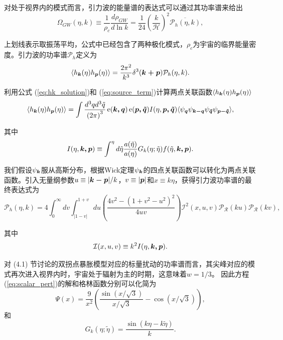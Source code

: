 对处于视界内的模式而言，引力波的能量谱的表达式可以通过其功率谱来给出
\begin{equation}\label{eq:gw_energy_spectrum}
    \Omega_{GW}(\eta,k) \equiv \frac{1}{\rho_c}\frac{d\rho_{GW}}{d\ln k}
    = \frac{1}{24}{\left(\frac{k}{\mathcal{H}}\right)}^2
    \overline{\mathcal{P}_h(\eta,k)},
\end{equation}

上划线表示取振荡平均，公式中已经包含了两种极化模式，$\rho_c$为宇宙的临界能量密度。引力波的功率谱$\mathcal{P}_h$定义为
\begin{align}\label{eq:gw_power_spectrum}
    \langle h_{\boldsymbol{k}}(\eta)h_{\boldsymbol{p}}(\eta) \rangle =
    \frac{2\pi^2}{k^3}\delta^3(\boldsymbol{k+p})\mathcal{P}_h(\eta,k).
\end{align}

利用公式 (\ref{eq:hk_solution})和
(\ref{eq:source_term})计算两点关联函数$\langle
h_{\boldsymbol{k}}(\eta)h_{\boldsymbol{p}}(\eta)\rangle$
\begin{equation}
    \langle h_{\boldsymbol{k}}(\eta)h_{\boldsymbol{p}}(\eta)\rangle =
    \int \frac{d^3 q d^3 \tilde{q}}{{(2\pi)}^3}
    \,\mathrm{e}(\boldsymbol{k,
    q})\,\mathrm{e}(\boldsymbol{p,\tilde{q}})I(\eta,\boldsymbol{p,\tilde{q}})
    \langle
    \psi_{\boldsymbol{q}}\psi_{\boldsymbol{k-q}}\psi_{\boldsymbol{\tilde{q}}}\psi_{\boldsymbol{p-\tilde{q}}}
    \rangle,
\end{equation}

其中
\begin{equation}\label{eq:I_integrate}
    I(\eta,\boldsymbol{k,p}) \equiv \int^\eta d\tilde{\eta} 
    \frac{a(\tilde{\eta})}{a(\eta)}
    G_k(\eta;\tilde{\eta})f(\tilde{\eta},\boldsymbol{k,p}).
\end{equation}

我们假设$\psi_{\boldsymbol{k}}$服从高斯分布，根据Wick定理$\psi_{\boldsymbol{k}}$的四点关联函数可以转化为两点关联函数。引入无量纲参数$u\equiv
|\boldsymbol{k-p}|/k$，$v\equiv |\boldsymbol{p}|$和$x\equiv
k\eta$，获得引力波功率谱的最终表达式为\citep{kohri2018semianalytic}
\begin{equation}
    \mathcal{P}_h(\eta,k) = 4\int_0^\infty dv \int_{|1-v|}^{1+v} du 
    \left( \frac{4v^2-{(1+v^2-u^2)}^2}{4uv} \right)
    \mathcal{I}^2(x,u,v)\mathcal{P_R}(ku)\mathcal{P_R}(kv),
\end{equation}

其中
\begin{equation}
    \mathcal{I}(x,u,v) \equiv k^2 I(\eta,\boldsymbol{k, p}).
\end{equation}

对 (4.1)
节讨论的双拐点暴胀模型对应的标量扰动的功率谱而言，其尖峰对应的模式再次进入视界内时，宇宙处于辐射为主的时期，这意味着$w=1/3$。
因此方程 (\ref{eq:scalar_pert})的解和格林函数分别可以化简为
\begin{equation}\label{eq:scalar_pert_simplified}
    \Psi(x) = \frac{9}{x^2}\left(
        \frac{\sin(x/\sqrt{3})}{x/\sqrt{3}}-\cos(x/\sqrt{3})
        \right),
\end{equation}
和
\begin{equation}
    G_k(\eta;\tilde{\eta}) = \frac{\sin(k\eta-k\tilde{\eta})}{k}. 
\end{equation}

